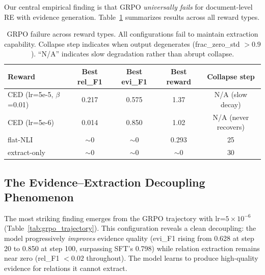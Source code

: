 \documentclass[11pt,a4paper]{article}
\begin{document}
Our central empirical finding is that GRPO \emph{universally fails} for document-level RE with evidence generation.
Table~\ref{tab:grpo_summary} summarizes results across all reward types.

\begin{table}[t]
\centering
\caption{GRPO failure across reward types. All configurations fail to maintain extraction capability. Collapse step indicates when output degenerates (frac\_zero\_std $> 0.9$). ``N/A'' indicates slow degradation rather than abrupt collapse.}
\label{tab:grpo_summary}
\small
\begin{tabular}{lcccc}
\toprule
\textbf{Reward} & \textbf{Best rel\_F1} & \textbf{Best evi\_F1} & \textbf{Best reward} & \textbf{Collapse step} \\
\midrule
CED (lr=5e-5, $\beta$=0.01) & 0.217 & 0.575 & 1.37 & N/A (slow decay) \\
CED (lr=5e-6)               & 0.014 & 0.850 & 1.02 & N/A (never recovers) \\
flat-NLI                     & $\sim$0   & $\sim$0   & 0.293 & 25 \\
extract-only                 & $\sim$0   & $\sim$0   & $\sim$0   & 30 \\
\bottomrule
\end{tabular}
\end{table}

\subsection{The Evidence--Extraction Decoupling Phenomenon}

The most striking finding emerges from the GRPO trajectory with lr=$5\times10^{-6}$ (Table~\ref{tab:grpo_trajectory}).
This configuration reveals a clean decoupling: the model progressively \emph{improves} evidence quality (evi\_F1 rising from 0.628 at step 20 to 0.850 at step 100, surpassing SFT's 0.798) while relation extraction remains near zero (rel\_F1 $< 0.02$ throughout).
The model learns to produce high-quality evidence for relations it cannot extract.
\end{document}
